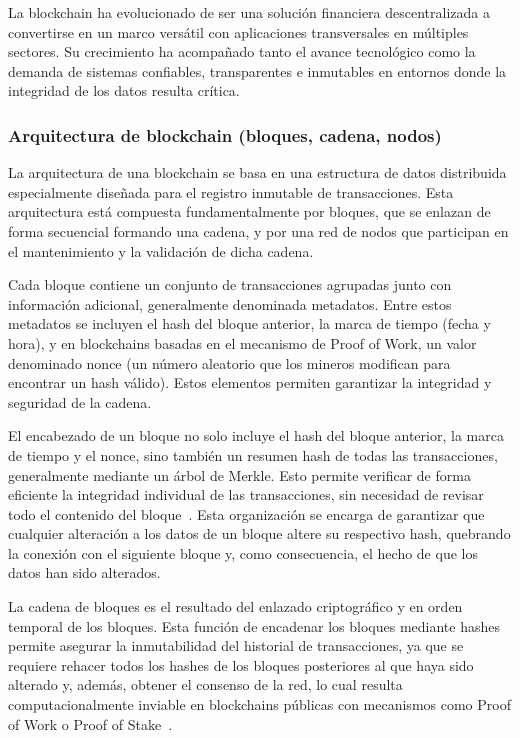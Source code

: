 La blockchain ha evolucionado de ser una solución financiera descentralizada a convertirse en un marco versátil con aplicaciones transversales en múltiples sectores. Su crecimiento ha acompañado tanto el avance tecnológico como la demanda de sistemas confiables, transparentes e inmutables en entornos donde la integridad de los datos resulta crítica.

\subsubsection{ Arquitectura de blockchain (bloques, cadena, nodos)}
La arquitectura de una blockchain se basa en una estructura de datos distribuida especialmente diseñada para el registro inmutable de transacciones. Esta arquitectura está compuesta fundamentalmente por bloques, que se enlazan de forma secuencial formando una cadena, y por una red de nodos que participan en el mantenimiento y la validación de dicha cadena.

Cada bloque contiene un conjunto de transacciones agrupadas junto con información adicional, generalmente denominada metadatos. Entre estos metadatos se incluyen el hash del bloque anterior, la marca de tiempo (fecha y hora), y en blockchains basadas en el mecanismo de Proof of Work, un valor denominado nonce (un número aleatorio que los mineros modifican para encontrar un hash válido). Estos elementos permiten garantizar la integridad y seguridad de la cadena. 

El encabezado de un bloque no solo incluye el hash del bloque anterior, la marca de tiempo y el nonce, sino también un resumen hash de todas las transacciones, generalmente mediante un árbol de Merkle. Esto permite verificar de forma eficiente la integridad individual de las transacciones, sin necesidad de revisar todo el contenido del bloque~\cite{Stallings2017}. Esta organización se encarga de garantizar que cualquier alteración a los datos de un bloque altere su respectivo hash, quebrando la conexión con el siguiente bloque y, como consecuencia, el hecho de que los datos han sido alterados.

La cadena de bloques es el resultado del enlazado criptográfico y en orden temporal de los bloques. Esta función de encadenar los bloques mediante hashes permite asegurar la inmutabilidad del historial de transacciones, ya que se requiere rehacer todos los hashes de los bloques posteriores al que haya sido alterado y, además, obtener el consenso de la red, lo cual resulta computacionalmente inviable en blockchains públicas con mecanismos como Proof of Work o Proof of Stake~\cite{nakamoto2008bitcoin}.


